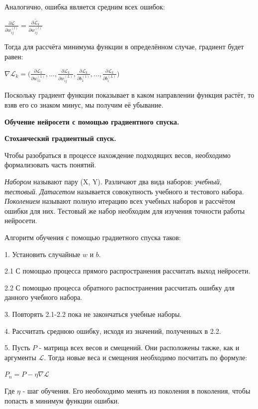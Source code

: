 \documentclass[12pt]{extarticle}
\begin{document}
	Аналогично, ошибка является средним всех ошибок:
	
	\centerline{$\frac{\partial \mathcal{L}}{\partial w_{ij}^{(l)}} = \overline{\frac{\partial \mathcal{L}_k}{\partial w_{ij}^{(l)}}}$}
	
	Тогда для рассчёта минимума функции в определённом случае, градиент будет равен:
	
	\centerline{$\nabla \mathcal{L}_k = \Big(\frac{\partial \mathcal{L}_k}{\partial w_{11}^{(1)}}, \dots, \frac{\partial \mathcal{L}_k}{\partial w_{ij}^{(L)}}, \frac{\partial \mathcal{L}_k}{\partial b_{1}^{(1)}}, \dots, \frac{\partial \mathcal{L}_k}{\partial b_{i}^{(L)}}\Big)$}
	Поскольку градиент функции показывает в каком направлении функция растёт, то взяв его со знаком минус, мы получим её убывание.
	
	\newpage
	
	\centerline{\textbf{Обучение нейросети с помощью градиентного спуска.}}
	\centerline{\textbf{Стохаический градиентный спуск.}}
	
	Чтобы разобраться в процессе нахождение подходящих весов, необходимо формализовать часть понятий. 
	
	\textit{Набором} называют пару (X, Y). Различают два вида наборов: \textit{учебный}, \textit{тестовый}. \textit{Датасетом} называется совокупность учебного и тестового набора. \textit{Поколением} называют полную итерацию всех учебных наборов и рассчётом ошибки для них. Тестовый же набор необходим для изучения точности работы нейросети. 
	
	Алгоритм обучения с помощью градиетного спуска таков:
	
	1. Установить случайные $w$ и $b$.
	
	2.1 С помощью процесса прямого распространения рассчитать выход нейросети.
	
	2.2 С помощью процесса обратного распостранения рассчитать ошибку для данного учебного набора. 
	
	3. Повторять 2.1-2.2 пока не закончаться учебные наборы. 
	
	4. Рассчитать среднюю ошибку, исходя из значений, полученных в 2.2.
	
	5. Пусть $P$ - матрица всех весов и смещений. Они расположены также, как и аргументы $\mathcal{L}$. Тогда новые веса и смещения необходимо посчитать по формуле:
	
	\centerline{$P_n = P - \eta \nabla \mathcal{L}$}	
	
	Где $\eta$ - шаг обучения. Его необоходимо менять из поколения в поколения, чтобы попасть в минимум функции ошибки. 
	
\end{document}
